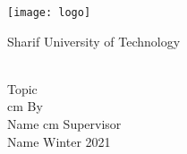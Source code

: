 \thispagestyle{empty}
\begin{center}
	\begin{latin}
		\texttt{[image: logo]}
		
		\begin{large}
		Sharif University of Technology \\ \enDep{} 
		\vskip 0.8cm
		\enlevel{} \entype{} \\ \enmajor{}
		
		\end{large}
		\vskip 3cm
		{Topic}         \\ \large{ \textbf{\entitle}}
		 cm
		{By}         \\ \large{Name}
		 cm
		{Supervisor} \\ \large{Name}
		\vskip 1cm
		\large{Winter 2021}
	\end{latin}
\end{center}

